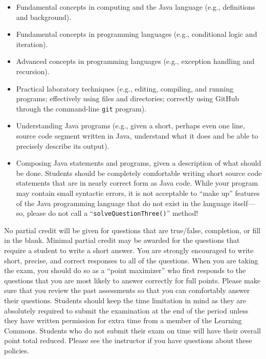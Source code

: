 \documentclass[11pt]{article}
\begin{document}
\vspace*{-.05in}
\begin{itemize}

  \itemsep 0in

  \item Fundamental concepts in computing and the Java language (e.g., definitions and background).

  \item Fundamental concepts in programming languages (e.g., conditional logic and iteration).

  \item Advanced concepts in programming languages (e.g., exception handling and recursion).

  \item Practical laboratory techniques (e.g., editing, compiling, and running programs; effectively using files and
    directories; correctly using GitHub through the command-line {\tt git} program).

  \item Understanding Java programs (e.g., given a short, perhaps even one line, source code segment written in Java,
    understand what it does and be able to precisely describe its output).

  \item Composing Java statements and programs, given a description of what should be done. Students should be completely
    comfortable writing short source code statements that are in nearly correct form as Java code. While your program may
    contain small syntactic errors, it is not acceptable to ``make up'' features of the Java programming language that do
    not exist in the language itself---so, please do not call a ``{\tt solveQuestionThree()}'' method!

\end{itemize}

\noindent No partial credit will be given for questions that are true/false,
completion, or fill in the blank. Minimal partial credit may be awarded for the
questions that require a student to write a short answer. You are strongly
encouraged to write short, precise, and correct responses to all of the
questions. When you are taking the exam, you should do so as a ``point
maximizer'' who first responds to the questions that you are most likely to
answer correctly for full points. Please make sure that you review the past
assessments so that you can comfortably answer their questions. Students should
keep the time limitation in mind as they are absolutely required to submit the
examination at the end of the period unless they have written permission for
extra time from a member of the Learning Commons. Students who do not submit
their exam on time will have their overall point total reduced. Please see the
instructor if you have questions about these policies.
\end{document}
